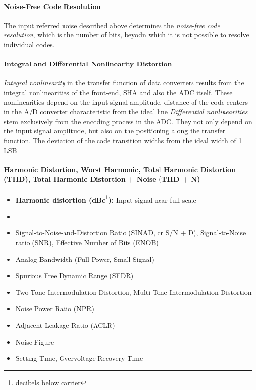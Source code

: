 \paragraph{Noise-Free Code Resolution}
The input referred noise described above determines the \textit{noise-free code resolution}, which is the number of bits, beyodn which it is not possible to resolve individual codes.

\paragraph{Integral and Differential Nonlinearity Distortion} 
\textit{Integral nonlinearity} in the transfer function of data converters results from the integral nonlinearities of the front-end, SHA and also the ADC itself. These nonlinearities depend on the input signal amplitude. distance of the code centers in the A/D converter characteristic from the ideal line
\textit{Differential nonlinearities} stem exclusively from the encoding process in the ADC. They not only depend on the input signal amplitude, but also on the positioning along the transfer function. The deviation of the code transition widths from the ideal width
of 1 LSB

\paragraph{Harmonic Distortion, Worst Harmonic, Total Harmonic Distortion (THD), Total Harmonic Distortion + Noise (THD + N)}

\begin{itemize}
	\item \textbf{Harmonic distortion (dBc\footnote{decibels below carrier}):} Input signal near full scale
\end{itemize}

\begin{itemize}
\item 
\item Signal-to-Noise-and-Distortion Ratio (SINAD, or S/N + D), Signal-to-Noise ratio (SNR), Effective Number of Bits (ENOB)
\item Analog Bandwidth (Full-Power, Small-Signal)
\item Spurious Free Dynamic Range (SFDR)
\item Two-Tone Intermodulation Distortion, Multi-Tone Intermodulation Distortion
\item Noise Power Ratio (NPR)
\item Adjacent Leakage Ratio (ACLR)
\item Noise Figure
\item Setting Time, Overvoltage Recovery Time
\end{itemize}

